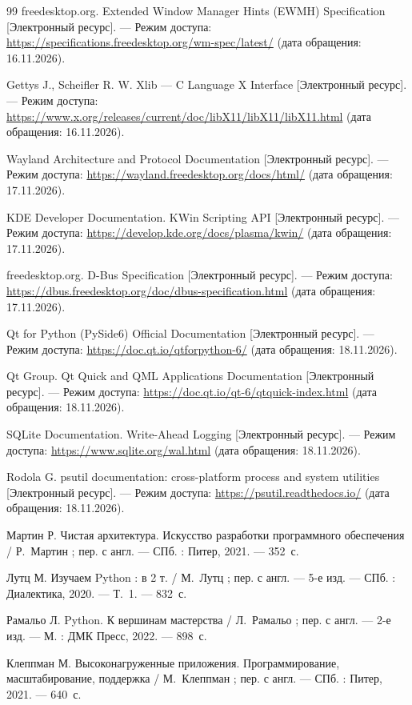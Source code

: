 \documentclass{timcw}
\begin{document}
\begin{thebibliography}{99}
freedesktop.org. Extended Window Manager Hints (EWMH) Specification [Электронный ресурс]. --- Режим доступа: \url{https://specifications.freedesktop.org/wm-spec/latest/} (дата обращения: 16.11.2026).

Gettys J., Scheifler R. W. Xlib --- C Language X Interface [Электронный ресурс]. --- Режим доступа: \url{https://www.x.org/releases/current/doc/libX11/libX11/libX11.html} (дата обращения: 16.11.2026).

Wayland Architecture and Protocol Documentation [Электронный ресурс]. --- Режим доступа: \url{https://wayland.freedesktop.org/docs/html/} (дата обращения: 17.11.2026).

KDE Developer Documentation. KWin Scripting API [Электронный ресурс]. --- Режим доступа: \url{https://develop.kde.org/docs/plasma/kwin/} (дата обращения: 17.11.2026).

freedesktop.org. D-Bus Specification [Электронный ресурс]. --- Режим доступа: \url{https://dbus.freedesktop.org/doc/dbus-specification.html} (дата обращения: 17.11.2026).

Qt for Python (PySide6) Official Documentation [Электронный ресурс]. --- Режим доступа: \url{https://doc.qt.io/qtforpython-6/} (дата обращения: 18.11.2026).

Qt Group. Qt Quick and QML Applications Documentation [Электронный ресурс]. --- Режим доступа: \url{https://doc.qt.io/qt-6/qtquick-index.html} (дата обращения: 18.11.2026).

SQLite Documentation. Write-Ahead Logging [Электронный ресурс]. --- Режим доступа: \url{https://www.sqlite.org/wal.html} (дата обращения: 18.11.2026).

Rodola G. psutil documentation: cross-platform process and system utilities [Электронный ресурс]. --- Режим доступа: \url{https://psutil.readthedocs.io/} (дата обращения: 18.11.2026).

Мартин Р. Чистая архитектура. Искусство разработки программного обеспечения / Р.~Мартин ; пер. с англ. --- СПб. : Питер, 2021. --- 352~с.

Лутц М. Изучаем Python : в 2 т. / М.~Лутц ; пер. с англ. --- 5-е изд. --- СПб. : Диалектика, 2020. --- Т.~1. --- 832~с.

Рамальо Л. Python. К вершинам мастерства / Л.~Рамальо ; пер. с англ. --- 2-е изд. --- М. : ДМК Пресс, 2022. --- 898~с.

Клеппман М. Высоконагруженные приложения. Программирование, масштабирование, поддержка / М.~Клеппман ; пер. с англ. --- СПб. : Питер, 2021. --- 640~с.

\end{thebibliography}
\end{document}
